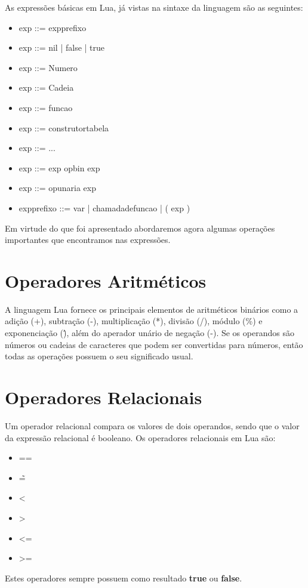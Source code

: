 \documentclass[
12pt, %
openright, %
oneside, %
a4paper, %
english, %
brazil, %
]{abntex2}
\begin{document}
As expressões básicas em Lua, já vistas na sintaxe da linguagem são as seguintes:
\begin{itemize}
\item exp ::= expprefixo
\item exp ::= nil | false | true
\item exp ::= Numero
\item exp ::= Cadeia
\item exp ::= funcao
\item exp ::= construtortabela
\item exp ::= ...
\item exp ::= exp opbin exp
\item exp ::= opunaria exp
\item expprefixo ::= var | chamadadefuncao | ( exp )
\end{itemize}

Em virtude do que foi apresentado abordaremos agora algumas operações importantes que encontramos nas expressões.

\section{Operadores Aritméticos}
A linguagem Lua fornece os principais elementos de aritméticos binários como a adição (+), subtração (-), multiplicação (*), divisão (/), módulo (\%) e exponenciação (\^ ), além do aperador unário de negação (-). Se os operandos são números ou cadeias de caracteres que podem ser convertidas para números, então todas as operações possuem o seu significado usual.

\section{Operadores Relacionais}
Um operador relacional compara os valores de dois operandos, sendo que o valor da expressão relacional é booleano. Os operadores relacionais em Lua são:

\begin{itemize}
  \item ==
  \item \~=
  \item <
  \item >
  \item <=
  \item >=
\end{itemize}

Estes operadores sempre possuem como resultado \textbf{true} ou \textbf{false}.
\end{document}
